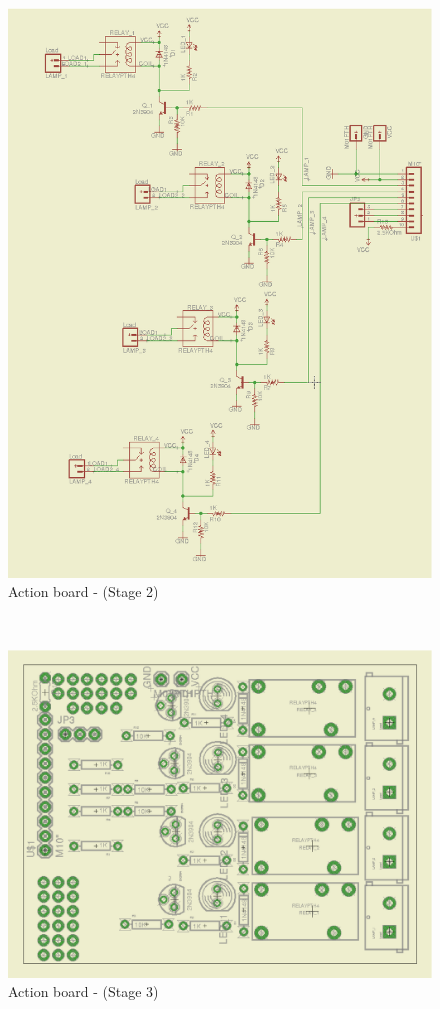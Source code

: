 \documentclass[12pt,a4paper,draft]{report}
\begin{document}
\begin{figure}[H]
\centering
\includegraphics*[scale=0.25]{action_brd_s2}
\caption{Action board -  (Stage 2)}
\label{Action-brd-s2}
\end{figure}
\ \\
\begin{figure}[H]
\centering
\includegraphics*[scale=0.25]{action_brd_s3}
\caption{Action board -  (Stage 3)}
\label{Action-brd-s3}
\end{figure}
\ \\
%
%
\end{document}
